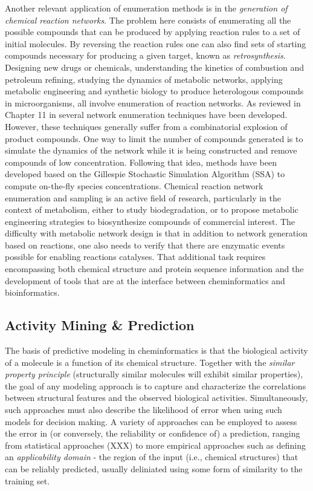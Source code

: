 \documentclass{sig-alternate}
\begin{document}
Another relevant application of enumeration methods is in the
\emph{generation of chemical reaction networks}. The problem here
consists of enumerating all the possible compounds that can be
produced by applying reaction rules to a set of initial molecules. By
reversing the reaction rules one can also find sets of starting
compounds necessary for producing a given target, known as
\emph{retrosynthesis}. Designing new drugs or chemicals, understanding
the kinetics of combustion and petroleum refining, studying the
dynamics of metabolic networks, applying metabolic engineering and
synthetic biology to produce heterologous compounds in microorganisms,
all involve enumeration of reaction networks. As reviewed in Chapter
11 in \cite{faulon2010} several network enumeration techniques have
been developed. However, these techniques generally suffer from a
combinatorial explosion of product compounds. One way to limit the
number of compounds generated is to simulate the dynamics of the
network while it is being constructed and remove compounds of low
concentration. Following that idea, methods have been developed based
on the Gillespie Stochastic Simulation Algorithm (SSA) to compute
on-the-fly species concentrations. Chemical reaction network
enumeration and sampling is an active field of research, particularly
in the context of metabolism, either to study biodegradation, or to
propose metabolic engineering strategies to biosynthesize compounds of
commercial interest. The difficulty with metabolic network design is
that in addition to network generation based on reactions, one also
needs to verify that there are enzymatic events possible for enabling
reactions catalyses. That additional task requires encompassing both
chemical structure and protein sequence information and the
development of tools that are at the interface between cheminformatics
and bioinformatics.

\subsection{Activity Mining \& Prediction}
\label{sec:activity-mining}


The basis of predictive modeling in cheminformatics is that the
biological activity of a molecule is a function of its chemical
structure. Together with the \emph{similar property principle}
\cite{Johnson:1990qf} (structurally similar molecules will exhibit
similar properties), the goal of any modeling approach is to capture
and characterize the correlations between structural features and the
observed biological activities. Simultaneously, such approaches must
also describe the likelihood of error when using such
models for decision making.  A variety of approaches can be employed
to assess the error in (or conversely, the reliability or confidence of) a
prediction, ranging from statistical approaches (XXX) to more
empirical approaches such as defining an \emph{applicability domain} -
the region of the input (i.e., chemical structures) that can be
reliably predicted, usually deliniated using some form of similarity
to the training set.
\end{document}
